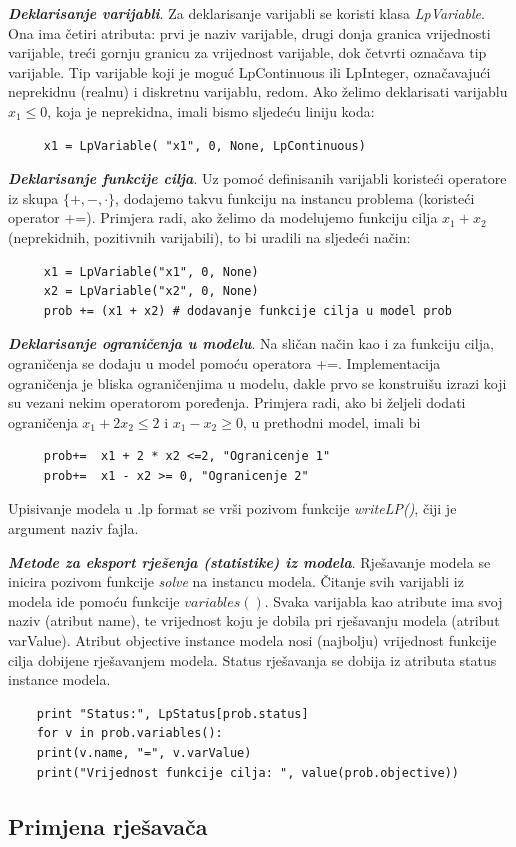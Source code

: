 \documentclass[a4paper, utf8, 11pt, colorlinks]{article}
\begin{document}
\textbf{\emph{Deklarisanje varijabli}}.  Za deklarisanje varijabli se koristi klasa \emph{LpVariable}. Ona ima četiri atributa: prvi je naziv varijable, drugi donja granica vrijednosti varijable, treći gornju granicu za vrijednost varijable, dok četvrti označava tip varijable. Tip varijable koji je moguć LpContinuous ili LpInteger, označavajući neprekidnu (realnu) i diskretnu varijablu, redom.  
Ako želimo deklarisati varijablu $x_1\leq 0$, koja je neprekidna, imali bismo sljedeću liniju koda:
\begin{verbatim}
	 x1 = LpVariable( "x1", 0, None, LpContinuous)
\end{verbatim}
\textbf{\emph{Deklarisanje funkcije cilja}}. Uz pomoć definisanih varijabli koristeći operatore iz skupa $\{+,-, \cdot \}$, dodajemo takvu funkciju na instancu problema (koristeći operator +=). Primjera radi, ako želimo da modelujemo funkciju cilja $x_1 + x_2$ (neprekidnih, pozitivnih varijabili), to bi uradili na sljedeći način:
\begin{verbatim}
	 x1 = LpVariable("x1", 0, None)
	 x2 = LpVariable("x2", 0, None) 
	 prob += (x1 + x2) # dodavanje funkcije cilja u model prob
\end{verbatim}  
\textbf{\emph{Deklarisanje ograničenja u modelu}}.  Na sličan način kao i za funkciju cilja, ograničenja se dodaju u model pomoću operatora +=. Implementacija ograničenja je bliska ograničenjima u modelu, dakle prvo se konstruišu izrazi koji su vezani nekim operatorom poređenja. Primjera radi, ako bi željeli dodati ograničenja $x_1 + 2 x_2 \leq 2$ i $x_1-x_2 \geq 0$,  u prethodni model, imali bi 
\begin{verbatim}
	 prob+=  x1 + 2 * x2 <=2, "Ogranicenje 1"
	 prob+=  x1 - x2 >= 0, "Ogranicenje 2" 
\end{verbatim}
Upisivanje modela u .lp format se vrši pozivom funkcije \emph{writeLP()}, čiji je argument naziv fajla. 

 \noindent \textbf{\emph{Metode za eksport rješenja (statistike) iz modela}}. Rješavanje modela se inicira pozivom funkcije \emph{solve} na instancu modela. Čitanje svih varijabli iz modela ide pomoću funkcije $variables()$. Svaka varijabla kao atribute ima svoj naziv (atribut name), te vrijednost koju je dobila pri rješavanju modela (atribut varValue). Atribut objective instance modela nosi (najbolju) vrijednost funkcije cilja dobijene rješavanjem modela. Status rješavanja se dobija iz atributa status instance modela. 
 
 \begin{verbatim}
 	print "Status:", LpStatus[prob.status]
 	for v in prob.variables():
 	print(v.name, "=", v.varValue)
 	print("Vrijednost funkcije cilja: ", value(prob.objective))
 \end{verbatim}
 \subsection{Primjena rješavača}%
 
\end{document}
